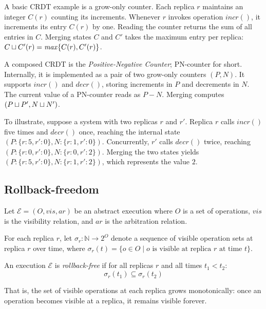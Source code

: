 \begin{example} \label{ex:counterCRDT}
  A basic CRDT example is a grow-only counter.
  Each replica $r$ maintains an integer $C(r)$ counting its increments.
  Whenever $r$ invokes operation $incr()$, it increments its entry $C(r)$ by one.
  Reading the counter returns the sum of all entries in $C$.
  Merging states $C$ and $C'$ takes the maximum entry per replica: $C \sqcup C'(r) = \mathit{max}\{C(r), C'(r)\}$.
  
  A composed CRDT is the \emph{Positive-Negative Counter}; PN-counter for short.
  Internally, it is implemented as a pair of two grow-only counters $(P, N)$.
  It supports $incr()$ and $decr()$, storing increments in $P$ and decrements in $N$.
  The current value of a PN-counter reads as $P - N$.
  Merging computes $(P \sqcup P', N \sqcup N')$.
  
  To illustrate, suppose a system with two replicas $r$ and $r'$.
   Replica $r$ calls $incr()$ five times and $decr()$ once, reaching the internal state $(P: \{r: 5, r': 0\}, N: \{r: 1, r': 0\})$.
  Concurrently, $r'$ calls $decr()$ twice, reaching $(P: \{r: 0, r': 0\}, N:\{r: 0, r': 2\})$.
  Merging the two states yields $(P:\{r: 5, r': 0\}, N:\{r: 1, r': 2\})$, which represents the value $2$.
\end{example}

\subsection{Rollback-freedom}
\begin{definition}
Let $\mathcal{E} = (O, vis, ar)$ be an abstract execution where $O$ is a set of operations, $vis$ is the visibility relation, and $ar$ is the arbitration relation. 

For each replica $r$, let $\sigma_r: \mathbb{N} \to 2^O$ denote a sequence of visible operation sets at replica $r$ over time, where $\sigma_r(t) = \{o \in O \mid o \text{ is visible at replica } r \text{ at time } t\}$.

An execution $\mathcal{E}$ is \emph{rollback-free} if for all replicas $r$ and all times $t_1 < t_2$:
\begin{equation}
\sigma_r(t_1) \subseteq \sigma_r(t_2)
\end{equation}

That is, the set of visible operations at each replica grows monotonically: once an operation becomes visible at a replica, it remains visible forever.
\end{definition}

